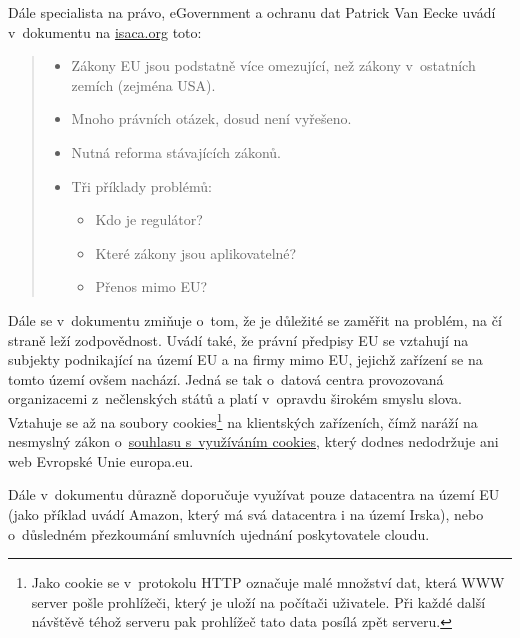 Dále specialista na právo, eGovernment a ochranu dat Patrick Van Eecke uvádí v~dokumentu na \href{http://www.isaca.org/Groups/Professional-English/cloud-computing/GroupDocuments/DLA_Cloud\%20computing\%20legal\%20issues.pdf}{isaca.org\cite{isaca:legalIssues}} toto:
\begin{quote}
	\begin{itemize}
		\item Zákony EU jsou podstatně více omezující, než zákony v~ostatních zemích (zejména USA).
		\item Mnoho právních otázek, dosud není vyřešeno.
		\item Nutná reforma stávajících zákonů.
		\item Tři příklady problémů:
		\begin{itemize}
			\item Kdo je regulátor?
			\item Které zákony jsou aplikovatelné?
			\item Přenos mimo EU?
		\end{itemize}
	\end{itemize}
\end{quote}
Dále se v~dokumentu zmiňuje o~tom, že je důležité se zaměřit na problém, na čí straně leží zodpovědnost. Uvádí také, že právní předpisy EU se vztahují na subjekty podnikající na území EU a na firmy mimo EU, jejichž zařízení se na tomto území ovšem nachází. Jedná se tak o~datová centra provozovaná organizacemi z~nečlenských států a platí v~opravdu širokém smyslu slova. Vztahuje se až na soubory cookies\footnote{Jako cookie se v~protokolu HTTP označuje malé množství dat, která WWW server pošle prohlížeči, který je uloží na počítači uživatele. Při každé další návštěvě téhož serveru pak prohlížeč tato data posílá zpět serveru.\cite{wiki:cookies}} na klientských zařízeních, čímž naráží na nesmyslný zákon o~\href{http://www.justit.cz/wordpress/2011/05/26/vcera-vstoupilo-v-platnost-susenkove-narizeni-eu-a-hned-bylo-odlozeno-o-rok/}{souhlasu s~využíváním cookies\cite{justit:susenky}}, který dodnes nedodržuje ani web Evropské Unie europa.eu.

Dále v~dokumentu důrazně doporučuje využívat pouze datacentra na území EU (jako příklad uvádí Amazon, který má svá datacentra i na území Irska), nebo o~důsledném přezkoumání smluvních ujednání poskytovatele cloudu.\cite{isaca:legalIssues}

\newpage
